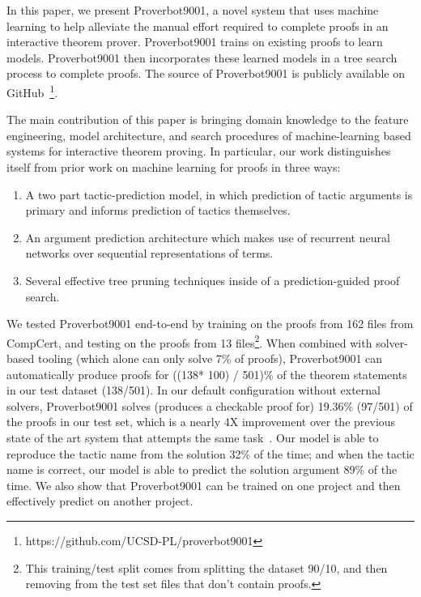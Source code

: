 \documentclass[sigplan,screen]{acmart}
\newcommand{\name}{Proverbot9001\xspace}
\newcommand{\PH}{138}
\newcommand{\PHPercent}{\number\numexpr((\PH * 100) / 501)\relax\%\xspace}
\renewcommand{\>}{\quad}
\begin{document}
In this paper, we present \name{}, a novel system that uses machine
learning to help alleviate the manual effort required to complete
proofs in an interactive theorem prover. \name{} trains on existing
proofs to learn models. \name{} then incorporates these learned models
in a tree search process to complete proofs. The source of \name is
publicly available on GitHub~\footnote{https://github.com/UCSD-PL/proverbot9001}.



The main contribution of this paper is bringing domain knowledge
  to the feature engineering, model architecture, and search procedures
  of machine-learning based systems for interactive theorem proving.
In particular, our work distinguishes itself from prior work on machine learning for proofs in three ways:
\begin{enumerate}
  \item A two part tactic-prediction model, in which prediction of tactic arguments is primary and informs prediction of tactics themselves.
  \item An argument prediction architecture which makes use of recurrent neural networks over sequential representations of terms.
  \item Several effective tree pruning techniques inside of a
    prediction-guided proof search.
\end{enumerate}

We tested \name{} end-to-end by training on the proofs from 162 files from CompCert,
  and testing on the proofs from 13 files\footnote{This training/test split comes from splitting the dataset
    90/10, and then removing from the test set files that don't contain proofs.}.
When combined with solver-based tooling (which alone can only solve 7\% of proofs),
\name{} can automatically produce proofs for \PHPercent of the theorem statements
in our test dataset (\PH/501).
In our default configuration without external solvers, \name{} solves
(produces a checkable proof for) 19.36\% (97/501) of the proofs in our
test set, which is a nearly 4X improvement over the previous state of
the art system that attempts the same task~\cite{coqgym}. Our model
is able to reproduce the tactic name from the solution 32\% of the
time; and when the tactic name is correct, our model is able to
predict the solution argument 89\% of the time.
We also show that Proverbot9001 can be trained on one project
  and then effectively predict on another project.
\end{document}
